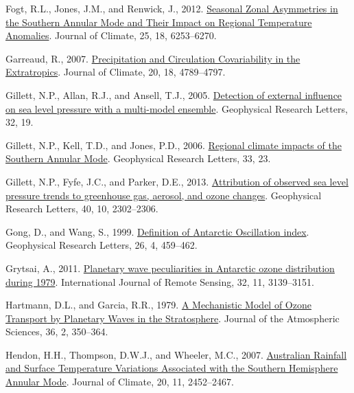 \documentclass[12pt,oneside]{reedthesis}
\newlength{\cslhangindent}
\newenvironment{CSLReferences}[2] %
 {%
  \setlength{\parindent}{0pt}
  \ifodd #1 \everypar{\setlength{\hangindent}{\cslhangindent}}\ignorespaces\fi
  \ifnum #2 > 0
  \setlength{\parskip}{#2\baselineskip}
  \fi
 }%
 {}
\begin{document}
\begin{CSLReferences}{1}{0}
\leavevmode{}%
Fogt, R.L., Jones, J.M., and Renwick, J., 2012. \href{https://doi.org/10.1175/JCLI-D-11-00474.1}{Seasonal {Zonal Asymmetries} in the {Southern Annular Mode} and {Their Impact} on {Regional Temperature Anomalies}}. Journal of Climate, 25, 18, 6253--6270.

\leavevmode{}%
Garreaud, R., 2007. \href{https://doi.org/10.1175/JCLI4257.1}{Precipitation and {Circulation Covariability} in the {Extratropics}}. Journal of Climate, 20, 18, 4789--4797.

\leavevmode{}%
Gillett, N.P., Allan, R.J., and Ansell, T.J., 2005. \href{https://doi.org/10.1029/2005GL023640}{Detection of external influence on sea level pressure with a multi-model ensemble}. Geophysical Research Letters, 32, 19.

\leavevmode{}%
Gillett, N.P., Kell, T.D., and Jones, P.D., 2006. \href{https://doi.org/10.1029/2006GL027721}{Regional climate impacts of the {Southern Annular Mode}}. Geophysical Research Letters, 33, 23.

\leavevmode{}%
Gillett, N.P., Fyfe, J.C., and Parker, D.E., 2013. \href{https://doi.org/10.1002/grl.50500}{Attribution of observed sea level pressure trends to greenhouse gas, aerosol, and ozone changes}. Geophysical Research Letters, 40, 10, 2302--2306.

\leavevmode{}%
Gong, D., and Wang, S., 1999. \href{https://doi.org/10.1029/1999GL900003}{Definition of {Antarctic Oscillation} index}. Geophysical Research Letters, 26, 4, 459--462.

\leavevmode{}%
Grytsai, A., 2011. \href{https://doi.org/10.1080/01431161.2010.541518}{Planetary wave peculiarities in {Antarctic} ozone distribution during 1979}. International Journal of Remote Sensing, 32, 11, 3139--3151.

\leavevmode{}%
Hartmann, D.L., and Garcia, R.R., 1979. \href{https://doi.org/10.1175/1520-0469(1979)036\%3C0350:AMMOOT\%3E2.0.CO;2}{A {Mechanistic Model} of {Ozone Transport} by {Planetary Waves} in the {Stratosphere}}. Journal of the Atmospheric Sciences, 36, 2, 350--364.

\leavevmode{}%
Hendon, H.H., Thompson, D.W.J., and Wheeler, M.C., 2007. \href{https://doi.org/10.1175/JCLI4134.1}{Australian {Rainfall} and {Surface Temperature Variations Associated} with the {Southern Hemisphere Annular Mode}}. Journal of Climate, 20, 11, 2452--2467.


\end{CSLReferences}
\end{document}

